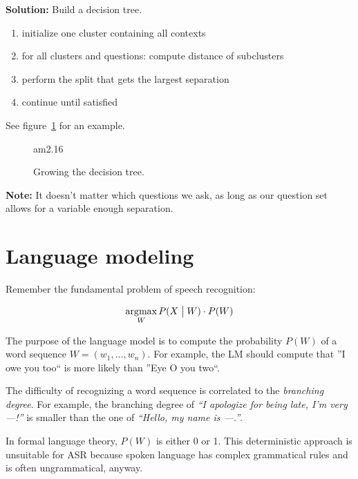 \documentclass[11pt]{article}
\DeclareMathOperator*{\argmax}{\arg\!\max}
\begin{document}
\textbf{Solution:} Build a decision tree.

\vspace{10pt}

\begin{enumerate}
    \item initialize one cluster containing all contexts
    \item for all clusters and questions: compute distance of subclusters
    \item perform the split that gets the largest separation
    \item continue until satisfied
\end{enumerate}

See figure~\ref{fig:growDecisionTree} for an example.

\begin{figure}[htb]
    \begin{minipage}{\linewidth}
        \vspace{5cm}
        \hfill \scriptsize am2.16
    \end{minipage}
    \caption{\label{fig:growDecisionTree} Growing the decision tree.}
\end{figure}

\textbf{Note:} It doesn't matter which questions we ask, as long as our question set allows for a variable enough separation.

\section{Language modeling}

Remember the fundamental problem of speech recognition:

\[
    \argmax_W P(X \bigm| W) \cdot P(W)
\]

The purpose of the language model is to compute the probability $P(W)$ of a word sequence $W = (w_1, \ldots, w_n)$. For example, the LM should compute that ''I owe you too`` is more likely than ''Eye O you two``.

The difficulty of recognizing a word sequence is correlated to the \textit{branching degree}. For example, the branching degree of \textit{``I apologize for being late, I'm very ---!''} is smaller than the one of \textit{``Hello, my name is ---.''}.

In formal language theory, $P(W)$ is either 0 or 1. This deterministic approach is unsuitable for ASR because spoken language has complex grammatical rules and is often ungrammatical, anyway.
\end{document}
